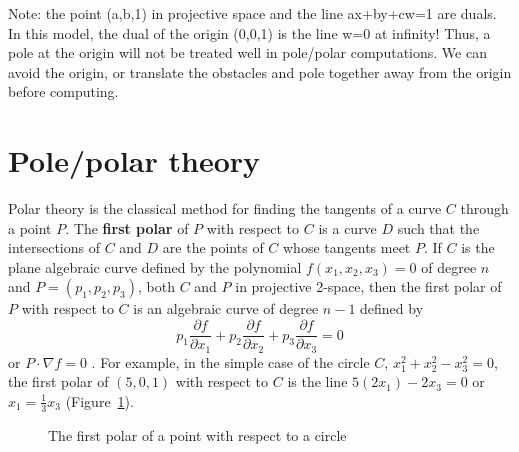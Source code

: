 \documentclass[11pt]{article}
\begin{document}
Note: the point (a,b,1) in projective space and the line ax+by+cw=1 are duals.
     In this model, the dual of the origin (0,0,1) is the line w=0 at infinity!
     Thus, a pole at the origin will not be treated well in pole/polar 
     computations.
     We can avoid the origin, or translate the obstacles and pole together
     away from the origin before computing.


%

\section{Pole/polar theory}
\label{sec:pole}

Polar theory is the classical method for finding the tangents of a curve $C$
through a point $P$.
The {\bf first polar} of $P$ with respect to $C$ is a curve $D$ such that
the intersections of $C$ and $D$ are the points of $C$ whose tangents meet $P$.
If $C$ is the plane algebraic curve defined by the polynomial $f(x_1,x_2,x_3)=0$
of degree $n$ and $P = (p_1,p_2,p_3)$, both $C$ and $P$ in projective 2-space,
then the first polar of $P$ with respect to $C$ 
is an algebraic curve of degree $n-1$ defined by
\[
	p_1 \frac{\partial f}{\partial x_1} +
	p_2 \frac{\partial f}{\partial x_2} +
	p_3 \frac{\partial f}{\partial x_3} = 0
\]
or $P \cdot \nabla f = 0$ \cite{semple85}.	%
For example, in the simple case of the circle $C$, $x_1^2 + x_2^2 - x_3^2 = 0$,
the first polar of $(5,0,1)$ with respect to $C$ is the line
$5(2x_1) - 2x_3 = 0$ or $x_1 = \frac{1}{3}x_3$ (Figure~\ref{fig:polar}).

\begin{figure}
\vspace{2.5in}
\caption{The first polar of a point with respect to a circle}
\label{fig:polar}
\end{figure}
\end{document}
